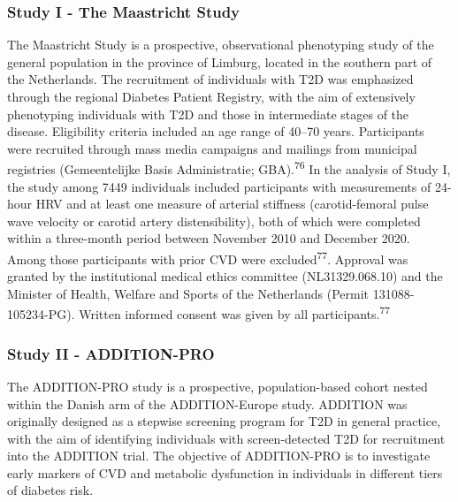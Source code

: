 \documentclass[
  letterpaper,
  headsepline=true,
  open=any]{scrbook}
\begin{document}
\hypertarget{study-i---the-maastricht-study}{%
\subsubsection{Study I - The Maastricht
Study}\label{study-i---the-maastricht-study}}

The Maastricht Study is a prospective, observational phenotyping study
of the general population in the province of Limburg, located in the
southern part of the Netherlands. The recruitment of individuals with
T2D was emphasized through the regional Diabetes Patient Registry, with
the aim of extensively phenotyping individuals with T2D and those in
intermediate stages of the disease. Eligibility criteria included an age
range of 40--70 years. Participants were recruited through mass media
campaigns and mailings from municipal registries (Gemeentelijke Basis
Administratie; GBA).\textsuperscript{76} In the analysis of Study I, the
study among 7449 individuals included participants with measurements of
24-hour HRV and at least one measure of arterial stiffness
(carotid-femoral pulse wave velocity or carotid artery distensibility),
both of which were completed within a three-month period between
November 2010 and December 2020. Among those participants with prior CVD
were excluded\textsuperscript{77}. Approval was granted by the
institutional medical ethics committee (NL31329.068.10) and the Minister
of Health, Welfare and Sports of the Netherlands (Permit
131088-105234-PG). Written informed consent was given by all
participants.\textsuperscript{77}

\hypertarget{study-ii---addition-pro}{%
\subsubsection{Study II - ADDITION-PRO}\label{study-ii---addition-pro}}

The ADDITION-PRO study is a prospective, population-based cohort nested
within the Danish arm of the ADDITION-Europe study. ADDITION was
originally designed as a stepwise screening program for T2D in general
practice, with the aim of identifying individuals with screen-detected
T2D for recruitment into the ADDITION trial. The objective of
ADDITION-PRO is to investigate early markers of CVD and metabolic
dysfunction in individuals in different tiers of diabetes risk.
\end{document}
